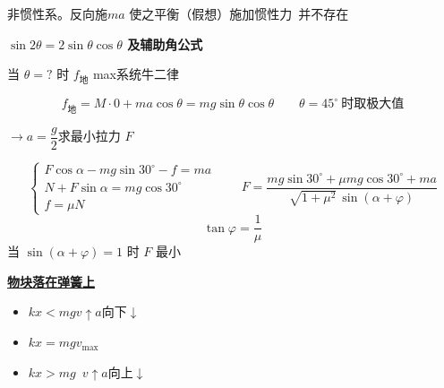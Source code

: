 \noindent 非惯性系。反向施$ma$ 使之平衡（假想）\quad 施加惯性力\ 并不存在
\begin{problem}[4]
\textbf{$\sin2\theta=2\sin\theta\cos\theta$ 及辅助角公式}


当 $\theta=?$ 时 $f_{\text{地}}$ max\qquad 系统牛二律
\begin{solution}
\[f_{\text{地}}=M\cdot0+ma\cos\theta=mg\sin\theta\cos\theta\qquad \theta=45^\circ\ \text{时取极大值}\]
\end{solution}
\end{problem}
\begin{problem}[5]

$\to a=\dfrac{g}{2}$\quad 求最小拉力 $F$
\begin{solution}
\[\left\{\begin{array}{l}F\cos\alpha-mg\sin30^\circ-f=ma\\ N+F\sin\alpha=mg\cos30^\circ\\ f=\mu N\end{array}\right.\qquad F=\frac{mg\sin30^\circ+\mu mg\cos30^\circ+ma}{\sqrt{1+\mu^2}\,\sin(\alpha+\varphi)}\]
\[\tan\varphi=\frac{1}{\mu}\]
当 $\sin(\alpha+\varphi)=1$ 时 $F$ 最小
\end{solution}
\end{problem}
\textbf{\underline{物块落在弹簧上}}


\begin{itemize}
\item[A] $kx<mg$\quad $v\uparrow$\quad $a$向下$\downarrow$
\item[O] $kx=mg$\quad $v_{\max}$
\item[B] $kx>mg$\quad {}\ $v\uparrow$\quad $a$向上$\downarrow$ %
\end{itemize}

